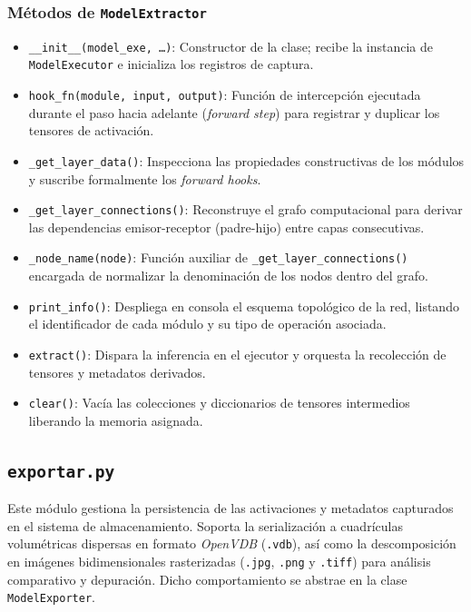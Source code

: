 \subsubsection*{Métodos de \texttt{ModelExtractor}}
\begin{itemize}
    \item \texttt{\_\_init\_\_(model\_exe, \dots)}: Constructor de la clase; recibe la instancia de \texttt{ModelExecutor} e inicializa los registros de captura.
    \item \texttt{hook\_fn(module, input, output)}: Función de intercepción ejecutada durante el paso hacia adelante (\textit{forward step}) para registrar y duplicar los tensores de activación.
    \item \texttt{\_get\_layer\_data()}: Inspecciona las propiedades constructivas de los módulos y suscribe formalmente los \textit{forward hooks}.
    \item \texttt{\_get\_layer\_connections()}: Reconstruye el grafo computacional para derivar las dependencias emisor-receptor (padre-hijo) entre capas consecutivas.
    \item \texttt{\_node\_name(node)}: Función auxiliar de \texttt{\_get\_layer\_connections()} encargada de normalizar la denominación de los nodos dentro del grafo.
    \item \texttt{print\_info()}: Despliega en consola el esquema topológico de la red, listando el identificador de cada módulo y su tipo de operación asociada.
    \item \texttt{extract()}: Dispara la inferencia en el ejecutor y orquesta la recolección de tensores y metadatos derivados.
    \item \texttt{clear()}: Vacía las colecciones y diccionarios de tensores intermedios liberando la memoria asignada.
\end{itemize}

\subsection{\texttt{exportar.py}}
Este módulo gestiona la persistencia de las activaciones y metadatos capturados en el sistema de almacenamiento. Soporta la 
serialización a cuadrículas volumétricas dispersas en formato \textit{OpenVDB} (\texttt{.vdb}), así como la descomposición 
en imágenes bidimensionales rasterizadas (\texttt{.jpg}, \texttt{.png} y \texttt{.tiff}) para análisis comparativo y depuración. 
Dicho comportamiento se abstrae en la clase \texttt{ModelExporter}.
\medskip


